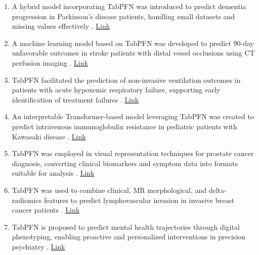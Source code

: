 \begin{enumerate}
\item A hybrid model incorporating TabPFN was introduced to predict dementia progression in Parkinson's disease patients, handling small datasets and missing values effectively \cite{hc_usecase6_pd_dementia_lightgbm_tabpfn}. \href{https://journals.sagepub.com/doi/full/10.1177/20552076241272585}{Link}

\item A machine learning model based on TabPFN was developed to predict 90-day unfavorable outcomes in stroke patients with distal vessel occlusions using CT perfusion imaging \cite{hc_usecase7_dmvo_ajnr}. \href{https://www.ajnr.org/content/early/2024/10/28/ajnr.A8547.abstract}{Link}


\item TabPFN facilitated the prediction of non-invasive ventilation outcomes in patients with acute hypoxemic respiratory failure, supporting early identification of treatment failures \cite{hc_usecase9_niv_tabpfn}. \href{https://www.researchgate.net/profile/Antonio-Esquinas/publication/393595503_Early-prediction-of-non-invasive_ventilation_outcome_using_the_TabPFN_machine_learning_model_a_multi-centre_validation_study/links/68718bc56e247f362b18c4b8/Early-prediction-of-non-invasive-ventilation-outcome-using-the-TabPFN-machine-learning-model-a-multi-centre-validation-study.pdf}{Link}

\item An interpretable Transformer-based model leveraging TabPFN was created to predict intravenous immunoglobulin resistance in pediatric patients with Kawasaki disease \cite{hc_usecase10_kawasaki_tabpfnv2}. \href{https://journals.plos.org/plosone/article?id=10.1371/journal.pone.0327564}{Link}

\item TabPFN was employed in visual representation techniques for prostate cancer diagnosis, converting clinical biomarkers and symptom data into formats suitable for analysis \cite{hc_usecase51_prostate_visual_rep}. \href{https://www.mdpi.com/2306-5354/11/7/635}{Link}

\item TabPFN was used to combine clinical, MR morphological, and delta-radiomics features to predict lymphovascular invasion in invasive breast cancer patients \cite{hc_usecase11_lvi_breast_tabpfn}. \href{https://journals.sagepub.com/doi/full/10.1177/15330338251362050}{Link}

\item TabPFN is proposed to predict mental health trajectories through digital phenotyping, enabling proactive and personalized interventions in precision psychiatry \cite{hc_usecase12_precision_psychiatry_tabpfn}. \href{https://onlinelibrary.wiley.com/doi/epdf/10.1002/mdr2.70017}{Link}


\end{enumerate}
